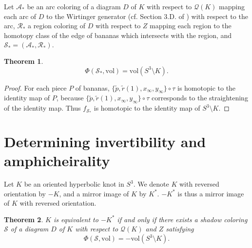 \documentclass[12pt]{amsart}
\newtheorem{theorem}{Theorem}[section]
\theoremstyle{definition}
\begin{document}
Let $\mathcal{A}_{\ast}$ be an arc coloring of a diagram $D$ of $K$ with respect to $\mathcal{Q}(K)$ mapping each arc of $D$ to the Wirtinger generator (cf. Section 3.D. of \cite{Rolfsen}) with respect to the arc, $\mathcal{R}_{\ast}$ a region coloring of $D$ with respect to $Z$ mapping each region to the homotopy class of the edge of bananas which intersects with the region, and $\mathcal{S}_{\ast} = (\mathcal{A}_{\ast}, \mathcal{R}_{\ast})$.

\begin{theorem}\label{thm:natural_coloring_2_cocycle}
\[
 \Phi(\mathcal{S}_{\ast}, \mathrm{vol}) = \mathrm{vol}(S^{3} \setminus K).
\]
\end{theorem}

\begin{proof}
For each piece $P$ of bananas, $\{ \widetilde{p}, \widetilde{r}(1), x_{\infty}, y_{\infty} \} \circ \tau$ is homotopic to the identity map of $P$, because $\{ \widetilde{p}, \widetilde{r}(1), x_{\infty}, y_{\infty} \} \circ \tau$ corresponds to the straightening of the identity map.
Thus $f_{\mathcal{S}_{\ast}}$ is homotopic to the identity map of $S^{3} \setminus K$.
\end{proof}

\section{Determining invertibility and amphicheirality}\label{sec:determining_invertibility_and_amphicheirality}

Let $K$ be an oriented hyperbolic knot in $S^{3}$.
We denote $K$ with reversed orientation by $-K$, and a mirror image of $K$ by $K^{\ast}$.
$-K^{\ast}$ is thus a mirror image of $K$ with reversed orientation.

\begin{theorem}\label{thm:negative_amphichirality}
$K$ is equivalent to $-K^{\ast}$ if and only if there exists a shadow coloring $\mathcal{S}$ of a diagram $D$ of $K$ with respect to $\mathcal{Q}(K)$ and $Z$ satisfying
\[
 \Phi(\mathcal{S}, \mathrm{vol}) = - \mathrm{vol}(S^{3} \setminus K).
\]
\end{theorem}
\end{document}
